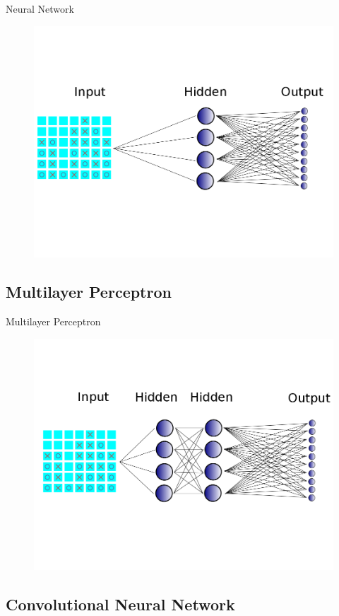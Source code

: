 \begin{frame}[plain]{Neural Network}
\begin{figure}
\includegraphics[width = 0.8 \textwidth]{"simple neural net all lines"}
\end{figure}
\end{frame}


\subsection{Multilayer Perceptron}


\begin{frame}[plain]{Multilayer Perceptron}
\begin{figure}
\includegraphics[width = 0.8 \textwidth]{"mlp all lines"}
\end{figure}
\end{frame}

\subsection{Convolutional Neural Network}


